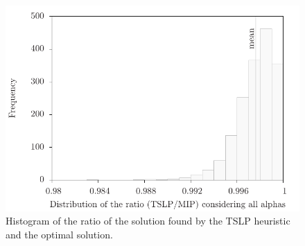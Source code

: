 \begin{figure}
\centering
\includegraphics[scale=0.7, trim=1cm 0 0 0]{imgs/lptsvsmip.pdf}
\caption{Histogram of the ratio of the solution found by the TSLP heuristic and the optimal solution.}
\label{fig:lptsvsmip}
\end{figure}


